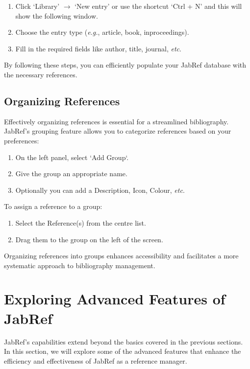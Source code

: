 				\begin{enumerate}
					\item Click `Library' \(\rightarrow\) `New entry' or use the shortcut `Ctrl + N' and this will show the following window.%
						\begin{center}%
						\end{center}%
					\item Choose the entry type (\textit{e.g.}, article, book, inproceedings).
					\item Fill in the required fields like author, title, journal, \textit{etc}.
				\end{enumerate}
				
				By following these steps, you can efficiently populate your JabRef database with the necessary references.

		\subsection{Organizing References}
			Effectively organizing references is essential for a streamlined bibliography. 
			JabRef's grouping feature allows you to categorize references based on your preferences:
			\begin{enumerate}
				\item On the left panel, select `Add Group`.
				\item Give the group an appropriate name.
				\item Optionally you can add a Description, Icon, Colour, \textit{etc}.
			\end{enumerate}
			
			To assign a reference to a group:
			\begin{enumerate}
				\item Select the Reference(s) from the centre list.
				\item Drag them to the group on the left of the screen.
			\end{enumerate}
			Organizing references into groups enhances accessibility and facilitates a more systematic approach to bibliography management.

	\section{Exploring Advanced Features of JabRef}
		JabRef's capabilities extend beyond the basics covered in the previous sections. 
		In this section, we will explore some of the advanced features that enhance the efficiency and effectiveness of JabRef as a reference manager.

